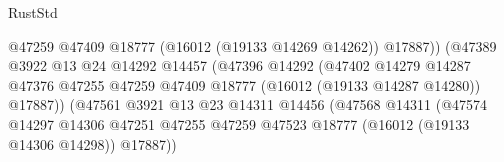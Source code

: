 \begin{lexlean}{RustStd}
\begin{coremodule}
                                                      @47259
                                                      @47409
                                                      @18777
                                                      (@16012 (@19133 @14269 @14262))
                                                      @17887))
                                                  (@47389
                                                    @3922
                                                    @13
                                                    @24
                                                    @14292
                                                    @14457
                                                    (@47396
                                                      @14292
                                                      (@47402
                                                        @14279
                                                        @14287
                                                        @47376
                                                        @47255
                                                        @47259
                                                        @47409
                                                        @18777
                                                        (@16012 (@19133 @14287 @14280))
                                                        @17887))
                                                    (@47561
                                                      @3921
                                                      @13
                                                      @23
                                                      @14311
                                                      @14456
                                                      (@47568
                                                        @14311
                                                        (@47574
                                                          @14297
                                                          @14306
                                                          @47251
                                                          @47255
                                                          @47259
                                                          @47523
                                                          @18777
                                                          (@16012 (@19133 @14306 @14298))
                                                          @17887))

\end{coremodule}
\end{lexlean}
